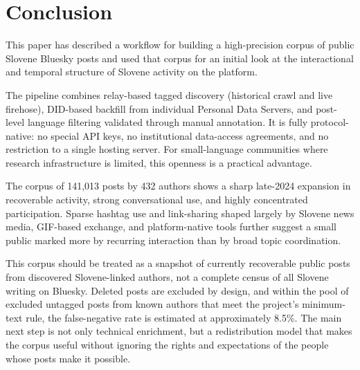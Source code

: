 \section{Conclusion}

This paper has described a workflow for building a high-precision corpus of public Slovene Bluesky posts and used that corpus for an initial look at the interactional and temporal structure of Slovene activity on the platform.

The pipeline combines relay-based tagged discovery (historical crawl and live firehose), DID-based backfill from individual Personal Data Servers, and post-level language filtering validated through manual annotation. It is fully protocol-native: no special API keys, no institutional data-access agreements, and no restriction to a single hosting server. For small-language communities where research infrastructure is limited, this openness is a practical advantage.

The corpus of 141,013 posts by 432 authors shows a sharp late-2024 expansion in recoverable activity, strong conversational use, and highly concentrated participation. Sparse hashtag use and link-sharing shaped largely by Slovene news media, GIF-based exchange, and platform-native tools further suggest a small public marked more by recurring interaction than by broad topic coordination.

This corpus should be treated as a snapshot of currently recoverable public posts from discovered Slovene-linked authors, not a complete census of all Slovene writing on Bluesky. Deleted posts are excluded by design, and within the pool of excluded untagged posts from known authors that meet the project's minimum-text rule, the false-negative rate is estimated at approximately 8.5\%. The main next step is not only technical enrichment, but a redistribution model that makes the corpus useful without ignoring the rights and expectations of the people whose posts make it possible.
